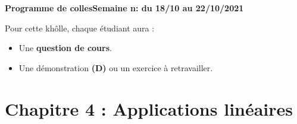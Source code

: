 \documentclass[twoside,a4paper,french,10pt]{VcCours}
\begin{document}

\begin{center}
\large\bf
Programme de collesSemaine n: du 18/10 au 22/10/2021
\end{center}
\separationTitre


Pour cette khôlle, chaque étudiant aura :
\begin{itemize}
\item Une \textbf{question de cours}.
\item Une démonstration \textbf{(D)} ou un exercice à retravailler.
\end{itemize}


\section*{Chapitre 4 : Applications linéaires}
\end{document}
